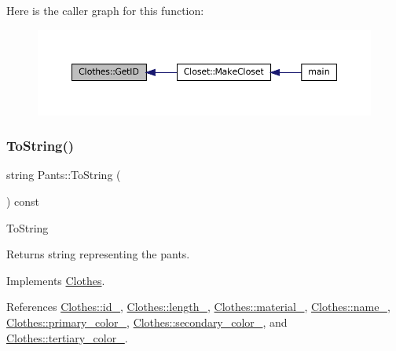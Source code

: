 Here is the caller graph for this function\+:
\nopagebreak
\begin{figure}[H]
\begin{center}
\leavevmode
\includegraphics[width=350pt]{classClothes_a3f6dac172f333126d19010f85ec44e4c_icgraph}
\end{center}
\end{figure}
\mbox{\label{classPants_a9b5fcde766a77877bf428e18c65f1e70}} 
\subsubsection{\texorpdfstring{To\+String()}{ToString()}}
{\footnotesize\ttfamily string Pants\+::\+To\+String (\begin{DoxyParamCaption}{ }\end{DoxyParamCaption}) const\hspace{0.3cm}{\ttfamily [virtual]}}

To\+String \begin{DoxyReturn}{Returns}
\textquotesingle{}string\textquotesingle{} representing the pants. 
\end{DoxyReturn}


Implements \mbox{\hyperlink{classClothes_a953d143394e9a2c007ab0c3a638973cf}{Clothes}}.



References \mbox{\hyperlink{classClothes_a8978d931db5ca47c3ccea30def4ae83e}{Clothes\+::id\+\_\+}}, \mbox{\hyperlink{classClothes_ae02603eda727e33caf46ec30e761e3c3}{Clothes\+::length\+\_\+}}, \mbox{\hyperlink{classClothes_adbb9ed311f14ccbb1e4fe0e8378a95d4}{Clothes\+::material\+\_\+}}, \mbox{\hyperlink{classClothes_a7f2275aaae24224d60c48af922c31b65}{Clothes\+::name\+\_\+}}, \mbox{\hyperlink{classClothes_a7cb005bf6cbb7f4eaa40f1b31817559c}{Clothes\+::primary\+\_\+color\+\_\+}}, \mbox{\hyperlink{classClothes_ab8f55f67b956b25d71260cffcf273673}{Clothes\+::secondary\+\_\+color\+\_\+}}, and \mbox{\hyperlink{classClothes_a3c5f1e7ab531e3ba7a38b930da8078a0}{Clothes\+::tertiary\+\_\+color\+\_\+}}.

